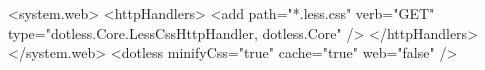 \begin{XML}[label=code:lessCssConfig,caption={Configuration of implicit LESS files compilation in \emph{Web.config}}]
<system.web>
	<httpHandlers>
		<add path="*.less.css" verb="GET"
			type="dotless.Core.LessCssHttpHandler, dotless.Core" />
	</httpHandlers>
</system.web>
<dotless minifyCss="true" cache="true" web="false" />
\end{XML}













